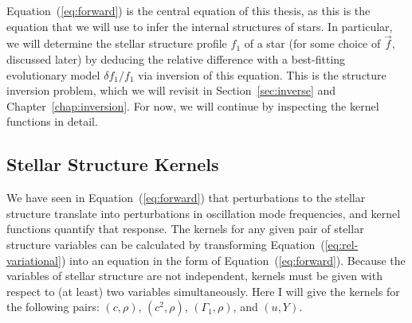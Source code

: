 Equation~(\ref{eq:forward}) is the central equation of this thesis, as this is the equation that we will use to infer the internal structures of stars. 
In particular, we will determine the stellar structure profile $f_1$ of a star (for some choice of $\vec{f}$, discussed later) by deducing the relative difference with a best-fitting evolutionary model ${\delta f_1/f_1}$ via inversion of this equation. 
This is the structure inversion problem, which we will revisit in Section~\ref{sec:inverse} and Chapter~\ref{chap:inversion}. 
For now, we will continue by inspecting the kernel functions in detail. 
%


\subsection{Stellar Structure Kernels}
\label{sec:kernels}
We have seen in Equation~(\ref{eq:forward}) that perturbations to the stellar structure translate into perturbations in oscillation mode frequencies, and kernel functions quantify that response. 
The kernels for any given pair of stellar structure variables can be calculated by transforming Equation~(\ref{eq:rel-variational}) into an equation in the form of Equation~(\ref{eq:forward}). 
Because the variables of stellar structure are not independent, kernels must be given with respect to (at least) two variables simultaneously. 
Here I will give the kernels for the following pairs: ${(c,\rho)}$, ${(c^2,\rho)}$, ${(\Gamma_1,\rho)}$, and ${(u,Y)}$. 

